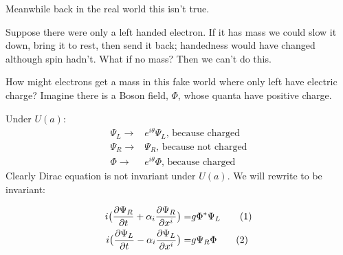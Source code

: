 \documentclass[]{article}
\newcommand\numberthis{\addtocounter{equation}{1}\tag{\theequation}}
\begin{document}
 Meanwhile back in the real world this isn't true.
 
 Suppose there were only a left handed electron. If it has mass we could slow it down, bring it to rest, then send it back; handedness would have changed although spin hadn't. What if no mass? Then we can't do this.
 
 How might electrons get a mass in this fake world where only left have electric charge? Imagine there is a Boson field, $\Phi$, whose quanta have positive charge.
 
 Under $U(a)$:
 \begin{align*}
 	\Psi_L \rightarrow& e^{i\theta} \Psi_L \text{, because charged}\\
 	\Psi_R \rightarrow& \Psi_R \text{, because not charged}\\
 	\Phi \rightarrow& e^{i\theta} \Phi \text{, because charged}
 \end{align*}
 Clearly Dirac equation is not invariant under $U(a)$. We will rewrite to be invariant:
 
 \begin{align*}
	 i \big(\frac{\partial \Psi_R}{\partial t} + \alpha_i \frac{\partial \Psi_R}{\partial 	x^i}\big) =& g \Phi^* \Psi_L \numberthis \label{eq:mod:Dirac:R}\\
	 i \big(\frac{\partial \Psi_L}{\partial t} - \alpha_i \frac{\partial \Psi_L}{\partial 	x^i}\big) =& g \Psi_R \Phi \numberthis \label{eq:mod:Dirac:L}
 \end{align*}
 
\end{document}
